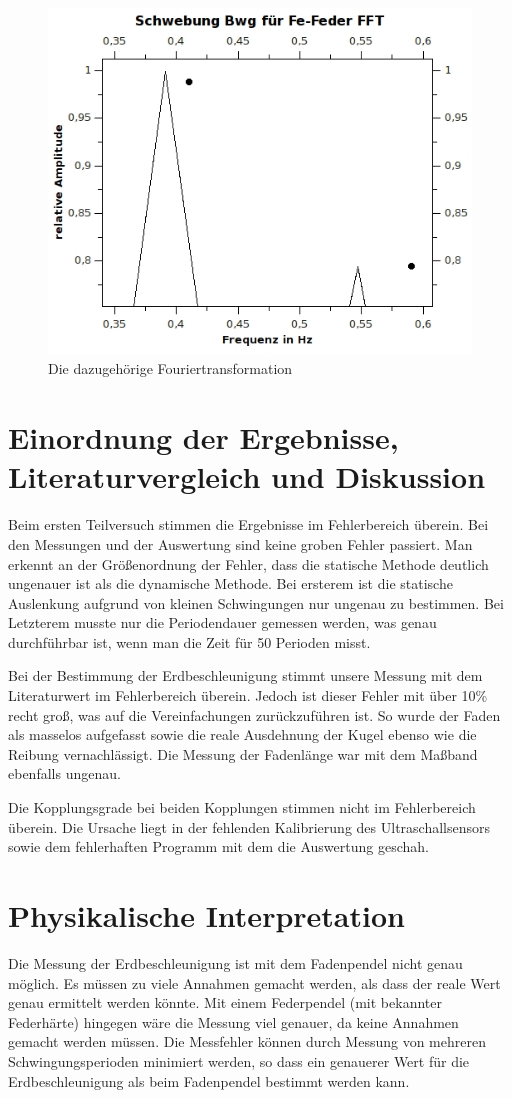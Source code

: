 \begin{figure}[h!]
\centering
\includegraphics[width=0.7\linewidth]{../Messungen/graphen/SchwebungvonFe-FederFFT}
\caption{Die dazugehörige Fouriertransformation}
\label{fig:SchwebungvonFe-FederFFT}
\end{figure}

\clearpage

\section{Einordnung der Ergebnisse, Literaturvergleich und Diskussion}

Beim ersten Teilversuch stimmen die Ergebnisse im Fehlerbereich überein. Bei den Messungen und der Auswertung sind keine groben Fehler passiert. Man erkennt an der Größenordnung der Fehler, dass die statische Methode deutlich ungenauer ist als die dynamische Methode. Bei ersterem ist die statische Auslenkung aufgrund von kleinen Schwingungen nur ungenau zu bestimmen. Bei Letzterem musste nur die Periodendauer gemessen werden, was genau durchführbar ist, wenn man die Zeit für 50 Perioden misst.

Bei der Bestimmung der Erdbeschleunigung stimmt unsere Messung mit dem Literaturwert im Fehlerbereich überein. Jedoch ist dieser Fehler mit über 10\% recht groß, was auf die Vereinfachungen zurückzuführen ist. So wurde der Faden als masselos aufgefasst sowie die reale Ausdehnung der Kugel ebenso wie die Reibung vernachlässigt. Die Messung der Fadenlänge war mit dem Maßband ebenfalls ungenau.

Die Kopplungsgrade bei beiden Kopplungen stimmen nicht im Fehlerbereich überein. Die Ursache liegt in der fehlenden Kalibrierung des Ultraschallsensors sowie dem fehlerhaften Programm mit dem die Auswertung geschah. %

\section{Physikalische Interpretation}

Die Messung der Erdbeschleunigung ist mit dem Fadenpendel nicht genau möglich. Es müssen zu viele Annahmen gemacht werden, als dass der reale Wert genau ermittelt werden könnte. Mit einem Federpendel (mit bekannter Federhärte) hingegen wäre die Messung viel genauer, da keine Annahmen gemacht werden müssen. Die Messfehler können durch Messung von mehreren Schwingungsperioden minimiert werden, so dass ein genauerer Wert für die Erdbeschleunigung als beim Fadenpendel bestimmt werden kann.
